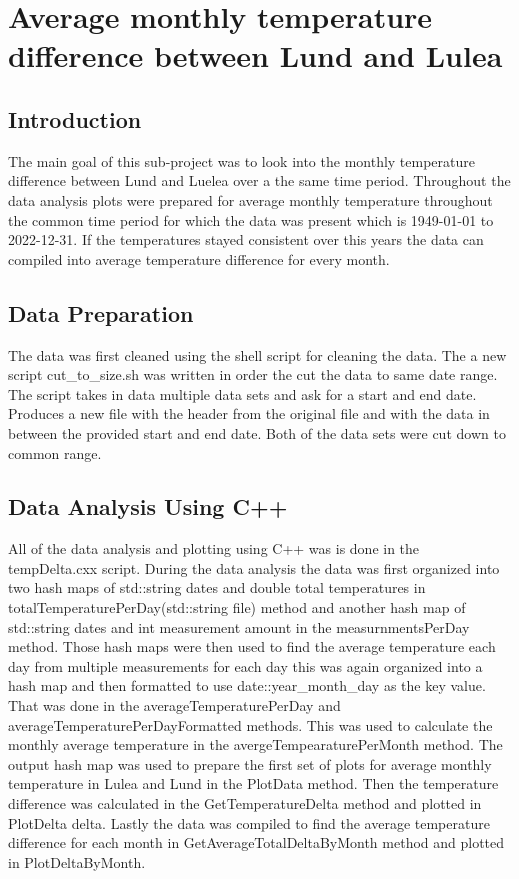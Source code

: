 \documentclass[aps,prl,groupedaddress,twocolumn]{revtex4-1}
\begin{document}
\newpage

\section{Average monthly temperature difference between Lund and Lulea}
\subsection{Introduction}
The main goal of this sub-project was to look into the monthly temperature difference between Lund and Luelea over a the same time period. Throughout the data analysis plots were prepared for average monthly temperature throughout the common time period for which the data was present which is 1949-01-01 to 2022-12-31. If the temperatures stayed consistent over this years the data can compiled into average temperature difference for every month. 
\subsection{Data Preparation}
The data was first cleaned using the shell script for cleaning the data. The a new script cut\_to\_size.sh was written in order the cut the data to same date range. The script takes in data multiple data sets and ask for a start and end date. Produces a new file with the header from the original file and with the data in between the provided start and end date. Both of the data sets were cut down to common range. 
\subsection{Data Analysis Using C++}
All of the data analysis and plotting using C++ was is done in the tempDelta.cxx script.
During the data analysis the data was first organized into two hash maps of std::string dates and double total temperatures in totalTemperaturePerDay(std::string file) method and another hash map of std::string dates and int measurement amount in the measurnmentsPerDay method. Those hash maps were then used to find the average temperature each day from multiple measurements for each day this was again organized into a hash map and then formatted to use date::year\_month\_day as the key value. That was done in the averageTemperaturePerDay and averageTemperaturePerDayFormatted methods. This was used to calculate the monthly average temperature in the avergeTempearaturePerMonth method. The output hash map was used to prepare the first set of plots for average monthly temperature in Lulea and Lund in the PlotData method. Then the temperature difference was calculated in the GetTemperatureDelta method and plotted in PlotDelta delta. Lastly the data was compiled to find the average temperature difference for each month in GetAverageTotalDeltaByMonth method and plotted in PlotDeltaByMonth.
\end{document}
